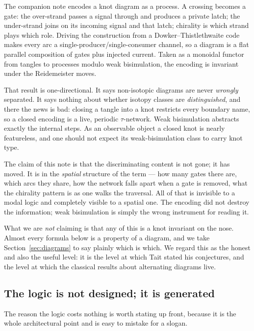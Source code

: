 \documentclass[11pt]{article}
\theoremstyle{definition}
\begin{document}
The companion note \cite{knots} encodes a knot diagram as a process. A crossing
becomes a gate: the over-strand passes a signal through and produces a private
latch; the under-strand joins on its incoming signal and that latch; chirality is
which strand plays which role. Driving the construction from a
Dowker--Thistlethwaite code makes every arc a single-producer/single-consumer
channel, so a diagram is a flat parallel composition of gates plus injected
current. Taken as a monoidal functor from tangles to processes modulo weak
bisimulation, the encoding is invariant under the Reidemeister moves.

That result is one-directional. It says non-isotopic diagrams are never
\emph{wrongly} separated. It says nothing about whether isotopy classes are
\emph{distinguished}, and there the news is bad: closing a tangle into a knot
restricts every boundary name, so a closed encoding is a live, periodic
$\tau$-network. Weak bisimulation abstracts exactly the internal steps. As an
observable object a closed knot is nearly featureless, and one should not expect
its weak-bisimulation class to carry knot type.

The claim of this note is that the discriminating content is not gone; it has
moved. It is in the \emph{spatial} structure of the term --- how many gates there
are, which arcs they share, how the network falls apart when a gate is removed,
what the chirality pattern is as one walks the traversal. All of that is invisible
to a modal logic and completely visible to a spatial one. The encoding did not
destroy the information; weak bisimulation is simply the wrong instrument for
reading it.

What we are \emph{not} claiming is that any of this is a knot invariant on the
nose. Almost every formula below is a property of a diagram, and we take
Section~\ref{sec:diagrams} to say plainly which is which. We regard this as the
honest and also the useful level: it is the level at which Tait stated his
conjectures, and the level at which the classical results about alternating
diagrams live.

\subsection{The logic is not designed; it is generated}

The reason the logic costs nothing is worth stating up front, because it is the
whole architectural point and is easy to mistake for a slogan.
\end{document}

